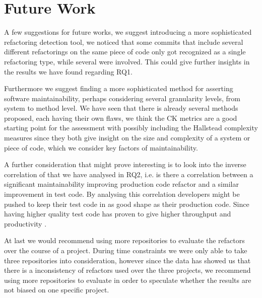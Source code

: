 \section{Future Work}
A few suggestions for future works, we suggest introducing a more sophisticated refactoring detection tool, we noticed that some commits that include several different refactorings on the same piece of code only got recognized as a single refactoring type, while several were involved. This could give further insights in the results we have found regarding RQ1.

Furthermore we suggest finding a more sophisticated method for asserting software maintainability, perhaps considering several granularity levels, from system to method level. We have seen that there is already several methods proposed, each having their own flaws, we think the CK metrics are a good starting point for the assessment with possibly including the Hallstead complexity measures \cite{halstead1977elements} since they both give insight on the size and complexity of a system or piece of code, which we consider key factors of maintainability.

A further consideration that might prove interesting is to look into the inverse correlation of that we have analysed in RQ2, i.e. is there a correlation between a significant maintainability improving production code refactor and a similar improvement in test code. By analysing this correlation developers might be pushed to keep their test code in as good shape as their production code. Since having higher quality test code has proven to give higher throughput and productivity \cite{athanasiou2011constructing}. 

At last we would recommend using more repositories to evaluate the refactors over the course of a project. During time constraints we were only able to take three repositories into consideration, however since the data has showed us that there is a inconsistency of refactors used over the three projects, we recommend using more repositories to evaluate in order to speculate whether the results are not biased on one specific project.